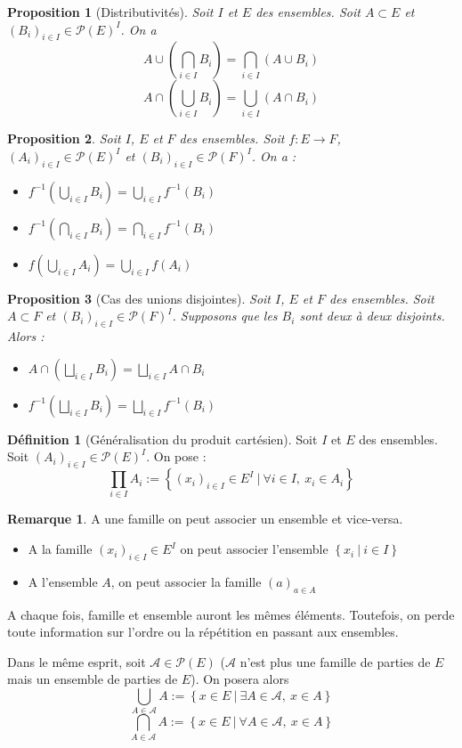 \documentclass[french]{book}
\newcommand{\inv}{^{-1}}
\theoremstyle{plain}
\newtheorem{prop}{Proposition}[chapter]
\theoremstyle{definition}
\newtheorem{dfn}{Définition}[chapter]
\newtheorem{rmq}{Remarque}[chapter]
\theoremstyle{remark}
\begin{document}
\begin{prop}[Distributivités]
	Soit $I$ et $E$ des ensembles. Soit $A\subset E$ et $(B_i)_{i\in I}\in\mathcal{P}(E)^I$. On a $$A\cup\left(\bigcap_{i\in I}B_i\right)=\bigcap_{i\in I}(A\cup B_i)$$ $$A\cap\left(\bigcup_{i\in I}B_i\right)=\bigcup_{i\in I}(A\cap B_i)$$
\end{prop}
\begin{prop}
	Soit $I$, $E$ et $F$ des ensembles. Soit $f:E\rightarrow F$, $(A_i)_{i\in I}\in\mathcal{P}(E)^I$ et $(B_i)_{i\in I}\in\mathcal{P}(F)^I$. On a : \begin{itemize}
		\item $\displaystyle f\inv\left(\bigcup_{i\in I}B_i\right)=\bigcup_{i\in I}f\inv(B_i)$
		\item $\displaystyle f\inv\left(\bigcap_{i\in I}B_i\right)=\bigcap_{i\in I}f\inv(B_i)$
		\item $\displaystyle f\left(\bigcup_{i\in I}A_i\right)=\bigcup_{i\in I}f(A_i)$
	\end{itemize}
\end{prop}
\begin{prop}[Cas des unions disjointes]
	Soit $I$, $E$ et $F$ des ensembles. Soit $A\subset F$ et $(B_i)_{i\in I}\in\mathcal{P}(F)^I$. Supposons que les $B_i$ sont deux à deux disjoints. Alors : \begin{itemize}
		\item $\displaystyle A\cap\left(\bigsqcup_{i\in I}B_i\right)=\bigsqcup_{i\in I}A\cap B_i$
		\item $\displaystyle f\inv\left(\bigsqcup_{i\in I}B_i\right)=\bigsqcup_{i\in I}f\inv(B_i)$
	\end{itemize}
\end{prop}
\begin{dfn}[Généralisation du produit cartésien]
	Soit $I$ et $E$ des ensembles. Soit $(A_i)_{i\in I}\in\mathcal{P}(E)^I$. On pose : $$\prod_{i\in I}A_i:=\left\{(x_i)_{i\in I}\in E^I\ | \ \forall i\in I,\ x_i\in A_i\right\}$$
\end{dfn}
\begin{rmq}
	A une famille on peut associer un ensemble et vice-versa.
	\begin{itemize}
		\item A la famille $(x_i)_{i\in I}\in E^I$ on peut associer l'ensemble $\left\{x_i\ | \ i\in I\right\}$
		\item A l'ensemble $A$, on peut associer la famille $(a)_{a\in A}$
	\end{itemize}
	A chaque fois, famille et ensemble auront les mêmes éléments. Toutefois, on perde toute information sur l'ordre ou la répétition en passant aux ensembles. \par Dans le même esprit, soit $\mathcal{A}\in\mathcal{P}(E)$ ($\mathcal{A}$ n'est plus une famille de parties de $E$ mais un ensemble de parties de $E$). On posera alors $$\bigcup_{A\in\mathcal{A}}A:=\left\{x\in E\ | \ \exists A\in\mathcal{A},\ x\in A\right\}$$ $$\bigcap_{A\in\mathcal{A}}A:=\left\{x\in E\ | \ \forall A\in\mathcal{A},\ x\in A\right\}$$
\end{rmq}
\end{document}
